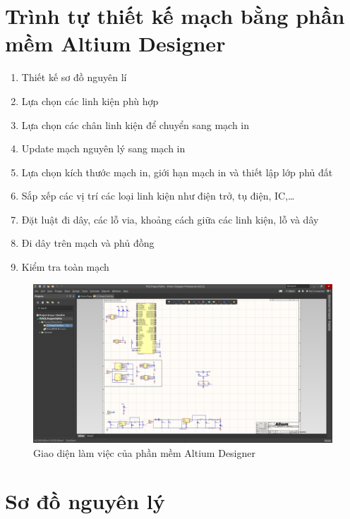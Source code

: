     \section{Trình tự thiết kế mạch bằng phần mềm Altium Designer}
        \begin{enumerate}
            \item Thiết kế sơ đồ nguyên lí
            \item Lựa chọn các linh kiện phù hợp
            \item Lựa chọn các chân linh kiện để chuyển sang mạch in
            \item Update mạch nguyên lý sang mạch in
            \item Lựa chọn kích thước mạch in, giới hạn mạch in và thiết lập lớp phủ đất
            \item Sắp xếp các vị trí các loại linh kiện như điện trở, tụ điện, IC,…
            \item Đặt luật đi dây, các lỗ via, khoảng cách giữa các linh kiện, lỗ và dây
            \item Đi dây trên mạch và phủ đồng
            \item Kiểm tra toàn mạch
        \end{enumerate}
        \begin{figure}[H]
            \centering
            \includegraphics[width=1\textwidth]{pictures/workspacealtium.png}
            \caption{Giao diện làm việc của phần mềm Altium Designer}
            \label{fig:workspacealtium}
        \end{figure}
        \cleardoublepage
    \section{Sơ đồ nguyên lý}
